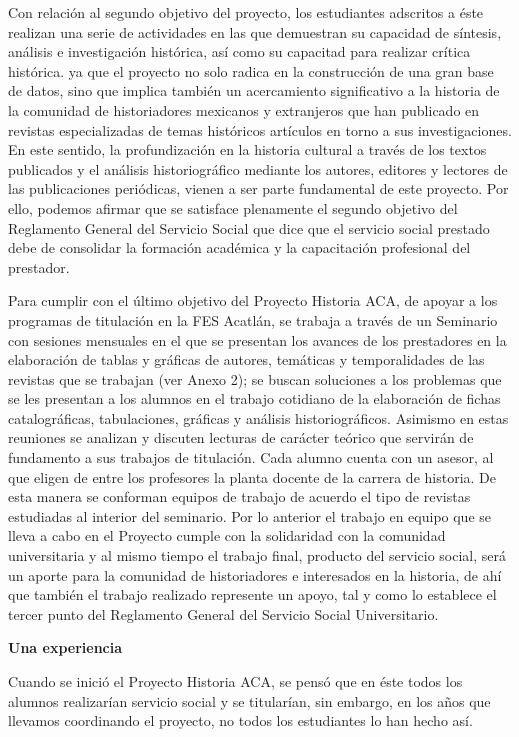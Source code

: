 Con relación al segundo objetivo del proyecto, los estudiantes adscritos a
éste realizan una serie de actividades en las que demuestran  su capacidad
de síntesis, análisis e investigación histórica, así como su capacitad para
realizar crítica histórica. ya que el proyecto no solo radica en la
construcción de una gran base de datos, sino que implica también un
acercamiento significativo a la historia de la comunidad de historiadores
mexicanos y extranjeros que han publicado en revistas especializadas de
temas históricos artículos en torno a sus investigaciones. En este sentido,
la profundización en la historia cultural a través de los textos publicados
y el análisis historiográfico mediante los autores, editores y lectores de
las publicaciones periódicas, vienen a ser parte fundamental de este
proyecto. Por ello, podemos afirmar que se satisface plenamente el segundo
objetivo del Reglamento General del Servicio Social que dice que el
servicio social prestado debe de consolidar la formación académica y la
capacitación profesional del prestador. 

Para cumplir con el último objetivo del Proyecto Historia ACA, de apoyar a
los programas de titulación en la FES Acatlán, se trabaja a través de un
Seminario con sesiones mensuales en el que se presentan los avances de los
prestadores en la elaboración de tablas y gráficas de autores, temáticas y
temporalidades de las revistas que se trabajan (ver Anexo 2); se buscan
soluciones a los problemas que se les presentan a los alumnos en el trabajo
cotidiano de la elaboración de fichas catalográficas, tabulaciones,
gráficas y análisis historiográficos. Asimismo en estas reuniones se
analizan y discuten lecturas de carácter teórico que servirán de fundamento
a sus trabajos de titulación.  Cada alumno cuenta con un asesor, al que
eligen de entre los profesores la planta docente de la carrera de historia.
De esta manera se conforman equipos de trabajo de acuerdo el tipo de
revistas estudiadas al interior del seminario. Por lo anterior el trabajo
en equipo que se lleva a cabo en el Proyecto cumple con la solidaridad con
la comunidad universitaria y al mismo tiempo el trabajo final, producto del
servicio social, será un aporte para la comunidad de historiadores e
interesados en la historia, de ahí que también el trabajo realizado
represente un apoyo, tal y como lo establece el tercer punto del Reglamento
General del Servicio Social Universitario. 

\bigskip
\textbf{Una experiencia}

Cuando se inició el Proyecto Historia ACA, se pensó que en éste todos los
alumnos realizarían servicio social y se titularían, sin embargo, en los
años que llevamos coordinando el proyecto, no todos los estudiantes lo han
hecho así.

